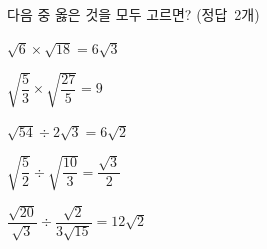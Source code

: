 다음 중 옳은 것을 모두 고르면? \mbox{(정답 2개)}
\begin{choicesii}{\rule[-3ex]{0pt}{8ex}$\sqrt{6}\times\sqrt{18}=6\sqrt{3}$}{\rule[-3ex]{0pt}{8ex}$\sqrt{\dfrac{5}{3}}\times\sqrt{\dfrac{27}{5}}=9$}{\rule[-3ex]{0pt}{8ex}$\sqrt{54}\div 2\sqrt{3}=6\sqrt{2}$}{\rule[-3ex]{0pt}{8ex}$\sqrt{\dfrac{5}{2}}\div\sqrt{\dfrac{10}{3}}=\dfrac{\sqrt{3}}{2}$}{\rule[-3ex]{0pt}{8ex}$\dfrac{\sqrt{20}}{\sqrt{3}}\div\dfrac{\sqrt{2}}{3\sqrt{15}}=12\sqrt{2}$}\end{choicesii}
